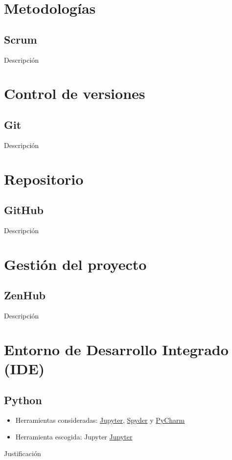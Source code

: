 
\section{Metodologías}\label{metodologias}
\subsection{Scrum}\label{scrum}
Descripción

\section{Control de versiones}\label{control-de-versiones}
\subsection{Git}\label{git}
Descripción

\section{Repositorio}\label{repositorio}
\subsection{GitHub}\label{github}
Descripción

\section{Gestión del proyecto}\label{gestion-del-proyecto}
\subsection{ZenHub}\label{zenhub}
Descripción

\section{Entorno de Desarrollo Integrado (IDE)}\label{ide}
\subsection{Python}\label{python}
\begin{itemize}
\tightlist
\item Herramientas consideradas: 
	\href{https://jupyter.org/}{Jupyter}, 
	\href{https://www.spyder-ide.org/}{Spyder} y
	\href{https://www.jetbrains.com/pycharm/}{PyCharm}
\item Herramienta escogida:
	Jupyter \href{https://jupyter.org/}{Jupyter}
\end{itemize}
Justificación

